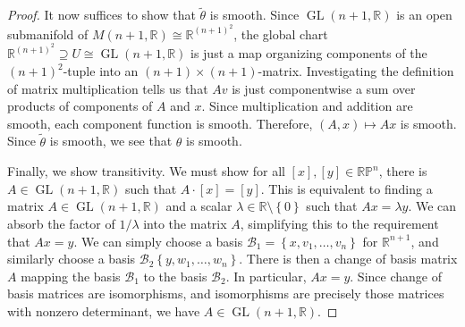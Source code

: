 \documentclass[11pt, letterpaper]{article}
\theoremstyle{plain}
\begin{document}
\begin{proof}
	It now suffices to show that $\widetilde{\theta } $ is smooth. Since $\operatorname{GL} (n+1,\mathbb{R} )$ is an open submanifold of $M(n+1,\mathbb{R} )\cong \mathbb{R} ^{(n+1)^2} $, the global chart $\mathbb{R} ^{(n+1)^2} \supseteq U \cong \operatorname{GL} (n+1,\mathbb{R} )$ is just a map organizing components of the $(n+1)^2$-tuple into an $(n+1)\times (n+1)$-matrix. Investigating the definition of matrix multiplication tells us that $Av$ is just componentwise a sum over products of components of $A$ and $x$. Since multiplication and addition are smooth, each component function is smooth. Therefore, $(A,x)\mapsto Ax$ is smooth. Since $\widetilde{\theta } $ is smooth, we see that $\theta $ is smooth.

	Finally, we show transitivity. We must show for all $[x],[y]\in\mathbb{R} \mathbb{P} ^n$, there is $A\in \operatorname{GL} (n+1,\mathbb{R} )$ such that $A\cdot [x]=[y]$. This is equivalent to finding a matrix $A\in \operatorname{GL} (n+1,\mathbb{R} )$ and a scalar $\lambda \in\mathbb{R} \setminus \left\{ 0 \right\} $ such that $Ax=\lambda y$. We can absorb the factor of $1/\lambda $ into the matrix $A$, simplifying this to the requirement that $Ax=y$. We can simply choose a basis $\mathcal{B}_1 =\left\{ x,v_1, \ldots ,v_n \right\} $ for $\mathbb{R} ^{n+1} $, and similarly choose a basis $\mathcal{B} _2\left\{ y,w_1, \ldots ,w_n \right\} $. There is then a change of basis matrix $A$ mapping the basis $\mathcal{B} _1$ to the basis $\mathcal{B} _2$. In particular, $Ax=y$. Since change of basis matrices are isomorphisms, and isomorphisms are precisely those matrices with nonzero determinant, we have $A\in \operatorname{GL} (n+1,\mathbb{R} )$.
\end{proof}
\end{document}
